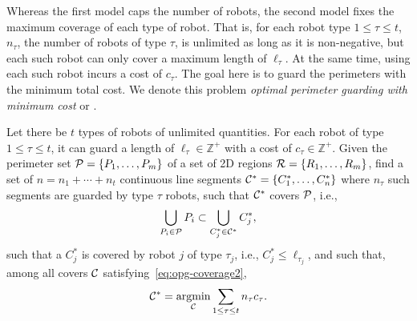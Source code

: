 Whereas the first model caps the number of robots, the second
model fixes the maximum coverage of each type of robot. That is, for 
each robot type $1 \le \tau \le t$, $n_{\tau}$, the number of robots of type $\tau$,
is unlimited as long as it is non-negative, but each such robot can only cover 
a maximum length of $\ell_{\tau}$. 
At the same time, using each such robot incurs a cost of $c_{\tau}$. The 
goal here is to guard the perimeters with the minimum total cost. We 
denote this problem {\em optimal perimeter guarding with minimum 
	cost} or \opgmc. 

\begin{problem} Let there be $t$ types of robots of unlimited quantities. 
	For each robot of type $1\le \tau \le t$, it can guard a length of 
	$\ell_{\tau}\in\mathbb{Z^+}$ with a cost of $c_{\tau}\in\mathbb{Z^+}$. Given the perimeter set
	$\P = \{P_1, \ldots, P_m\}$ of a set of 2D regions $\R =\{R_1, \ldots, 
	R_m\}$, find a set of $n = n_1 + \cdots + n_t$ continuous line segments 
	$\C^* = \{C_1^*, \ldots, C_n^*\}$ where $n_{\tau}$ such segments are 
	guarded by type $\tau$ robots, such that $\C^*$ covers $\P$, i.e., 
	\begin{align}\label{eq:opg-coverage2}
	\bigcup_{P_i \in \P} P_i  \subset \bigcup_{C_j^* \in \C^*} C_j^*,
	\end{align}
	such that a $C_j^*$ is covered by robot $j$ of type $\tau_j$, i.e., 
	$C_j^* \le \ell_{\tau_j}$, and such that,
	among all covers $\C$ satisfying~\eqref{eq:opg-coverage2}, 
	\begin{align}\label{eq:opg-objective2}
	\C^* = \underset{\C}{\mathrm{argmin}} \sum_{1 \le \tau \le t} 
	n_{\tau}c_{\tau}.
	\end{align}
\end{problem}
